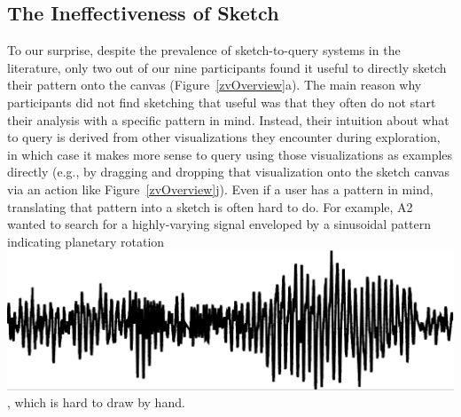 \subsection{The Ineffectiveness of Sketch}
\par To our surprise, 
despite the prevalence of sketch-to-query 
systems in the literature,  only two out of our nine participants 
found it useful to directly
sketch their pattern onto the canvas (Figure~\ref{zvOverview}a). %
The main reason why participants 
did not find sketching that useful was that 
they often do not start their analysis with a specific pattern in mind. 
Instead, their intuition about what to query is derived
from other visualizations they encounter
during exploration, in which case it makes
more sense to query using those visualizations
as examples directly (e.g., by dragging and dropping
that visualization onto the sketch canvas via an action like
Figure~\ref{zvOverview}j). 
Even if a user has a pattern in mind,
translating that pattern into a sketch is often hard
to do. For example, 
A2 wanted to search for a highly-varying signal 
enveloped by a sinusoidal pattern indicating 
planetary rotation \includegraphics[width=2\baselineskip,keepaspectratio]{figures/impossible_sketch.png}, which is hard to draw by hand.
